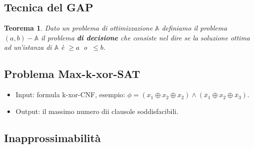 \documentclass[a4paper]{article}
\newtheorem{thm}{Teorema}[subsection]
\theoremstyle{definition}
\newcommand{\prob}[1]{\mathbb{#1}}
\begin{document}
		\subsection{Tecnica del GAP}
			\begin{thm}
				Dato un problema di ottimizzazione $ \prob{A} $ definiamo il problema $ (a, b) - \prob{A} $ il problema \textbf{di decisione} che consiste nel dire se la soluzione ottima ad un'istanza di $ \prob{A} $ è $ \geq a \ $ o $ \ \leq b $.
			\end{thm}
		
		\subsection{Problema Max-k-xor-SAT}
			\begin{itemize}
				\item Input: formula k-xor-CNF, esempio: $ \phi = (x_1 \oplus x_2\oplus x_2) \wedge (\overline{x}_1 \oplus x_2 \oplus \overline{x}_3) $.
				\item Output: il massimo numero dii clausole soddisfacibili.
			\end{itemize}
		
		\subsection{Inapprossimabilità}
		
		
\end{document}
